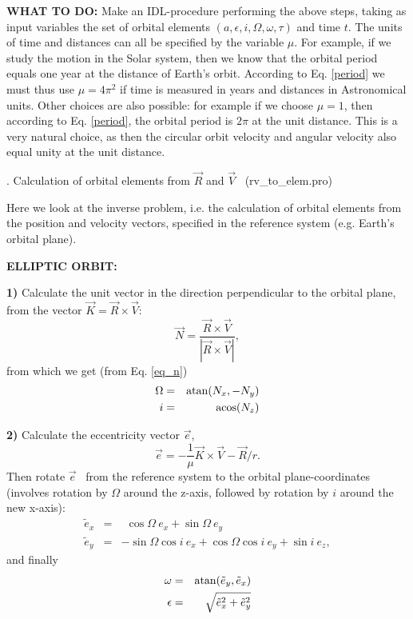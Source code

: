 \documentclass[a4paper,12pt]{article}
\def\sini {\sin i}
\def\cosi {\cos i}
\def\sino {\sin \Omega}
\def\coso {\cos \Omega}
\begin{document}
{{\vskip 1cm
{\bf WHAT TO DO: }
Make an IDL-procedure performing the above steps, taking as input
variables the set of orbital elements
$(a,\epsilon,i,\Omega,\omega,\tau)$ and time $t$.  The units of time
and distances can all be specified by the variable $\mu$. For example,
if we study the motion in the Solar system, then we know that the
orbital period equals one year at the distance of Earth's orbit.
According to Eq. \ref{period} we must thus use $\mu=4 \pi^2$ if time
is measured in years and distances in Astronomical units. Other
choices are also possible: for example if we choose $\mu=1$, then
according to Eq. \ref{period}, the orbital period is $2 \pi$ at the
unit distance.  This is a very natural choice, as then the circular
orbit velocity and angular velocity also equal unity at the unit distance.


\vskip 1cm
\newpage
{. Calculation of orbital elements from $\vec R$ and $\vec V$} \ (rv\_to\_elem.pro)

Here we look at the inverse problem, i.e. the calculation of orbital
elements from the position and velocity vectors, specified in the reference
system (e.g. Earth's orbital plane). 

{\bf ELLIPTIC ORBIT: }

{\bf 1)} Calculate the unit vector in the direction perpendicular to the
orbital plane, from the vector $\vec K=\vec R \times \vec V$:
\begin{equation}
 \vec N = \frac{\vec R \times \vec V}{|\vec R \times \vec V|},
\end{equation}
\noindent from which we get (from Eq. \ref{eq_n})
\begin{eqnarray}
\label{eq_ome_i}
\Omega &=& {\rm atan} (N_x,-N_y) \\ \nonumber
 i &=& {\rm acos} (N_z)
\end{eqnarray}

{\bf 2)} Calculate the eccentricity vector $\vec e$,
\begin{equation}
 \vec e = -\frac{1}{\mu} \vec K \times \vec V - \vec R/r. 
\end{equation}
\noindent Then rotate $\vec e$  \ from the reference system to the
orbital plane-coordinates (involves rotation by $\Omega$ around the z-axis,
followed by rotation by $i$ around the new x-axis):
\begin{eqnarray}
\tilde e_x &=& ~~ \coso \ e_x + \sino \ e_y \\ \nonumber
\tilde e_y &=& - \sino \cosi \ e_x + \coso \cosi  \ e_y + \sini \ e_z,
\end{eqnarray}
\noindent and finally
\begin{eqnarray}
\omega &=& {\rm atan} (\tilde e_y, \tilde e_x) \\ \nonumber
 \epsilon &=& \sqrt{{\tilde e_x}^2+{\tilde e_y}^2}
\end{eqnarray}

}}
\end{document}
